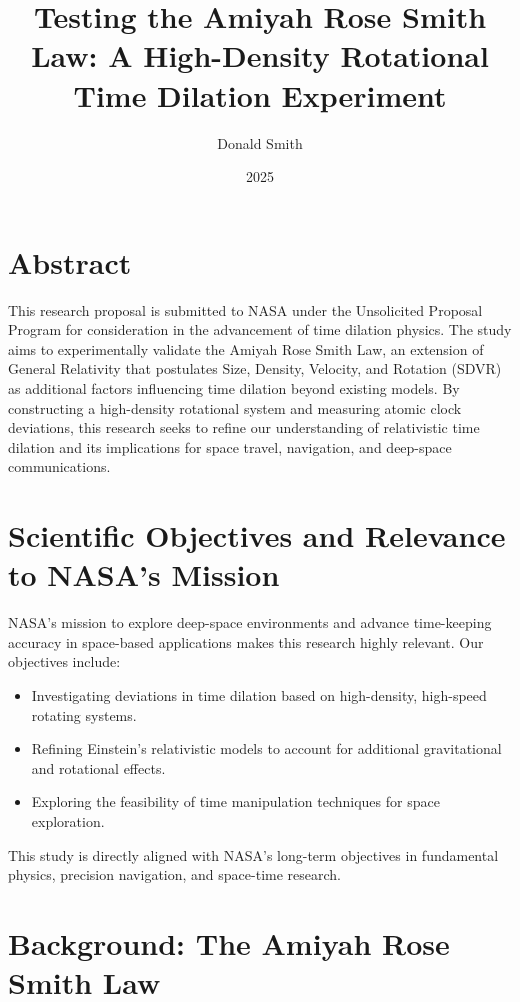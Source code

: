 \documentclass[12pt]{article}
\begin{document}
\title{Testing the Amiyah Rose Smith Law: A High-Density Rotational Time Dilation Experiment}
\author{Donald Smith}
\date{2025}
\maketitle

\section{Abstract}

This research proposal is submitted to NASA under the Unsolicited Proposal Program for consideration in the advancement of time dilation physics. 
The study aims to experimentally validate the Amiyah Rose Smith Law, an extension of General Relativity that postulates Size, Density, Velocity, and Rotation (SDVR) as additional factors influencing time dilation beyond existing models. 
By constructing a high-density rotational system and measuring atomic clock deviations, this research seeks to refine our understanding of relativistic time dilation and its implications for space travel, navigation, and deep-space communications.

\section{Scientific Objectives and Relevance to NASA's Mission}

NASA’s mission to explore deep-space environments and advance time-keeping accuracy in space-based applications makes this research highly relevant. 
Our objectives include:

\begin{itemize}
    \item Investigating deviations in time dilation based on high-density, high-speed rotating systems.
    \item Refining Einstein’s relativistic models to account for additional gravitational and rotational effects.
    \item Exploring the feasibility of time manipulation techniques for space exploration.
\end{itemize}

This study is directly aligned with NASA’s long-term objectives in fundamental physics, precision navigation, and space-time research.

\section{Background: The Amiyah Rose Smith Law}
\end{document}

